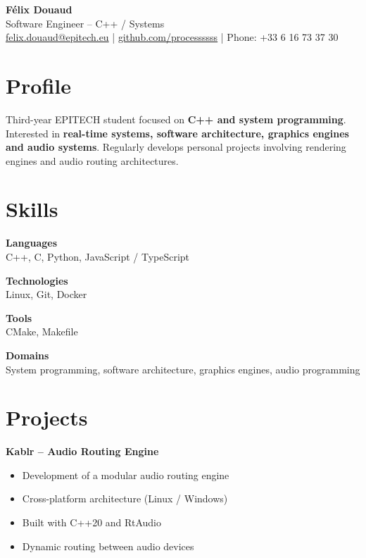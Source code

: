 \documentclass[11pt,a4paper]{article}
\begin{document}
\begin{center}
{\LARGE \textbf{Félix Douaud}} \\[4pt]
Software Engineer -- C++ / Systems \\[6pt]
\href{mailto:felix.douaud@gmail.com}{felix.douaud@epitech.eu} \quad | \quad
\href{https://github.com/processssss}{github.com/processssss} \quad | \quad
Phone: +33 6 16 73 37 30
\end{center}

\vspace{6pt}

\section*{Profile}

Third-year EPITECH student focused on \textbf{C++ and system programming}.  
Interested in \textbf{real-time systems, software architecture, graphics engines and audio systems}.  
Regularly develops personal projects involving rendering engines and audio routing architectures.

\section*{Skills}

\textbf{Languages} \\
C++, C, Python, JavaScript / TypeScript

\textbf{Technologies} \\
Linux, Git, Docker

\textbf{Tools} \\
CMake, Makefile

\textbf{Domains} \\
System programming, software architecture, graphics engines, audio programming

\section*{Projects}

\textbf{Kablr -- Audio Routing Engine}

\begin{itemize}
\item Development of a modular audio routing engine
\item Cross-platform architecture (Linux / Windows)
\item Built with C++20 and RtAudio
\item Dynamic routing between audio devices
\end{itemize}
\end{document}
